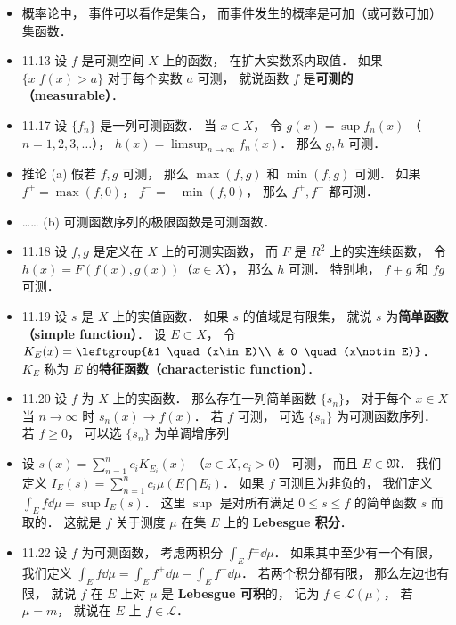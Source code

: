 \begin{itemize}
\item 概率论中， 事件可以看作是集合， 而事件发生的概率是可加（或可数可加）集函数．

\item 11.13 设 $f$ 是可测空间 $X$ 上的函数， 在扩大实数系内取值． 如果 $\{x|f(x)>a\}$ 对于每个实数 $a$ 可测， 就说函数 $f$ 是\textbf{可测的（measurable）}．

\item 11.17 设 $\{f_n\}$ 是一列可测函数． 当 $x\in X$， 令 $g(x)=\sup f_n(x)$ （$n=1,2,3,\dots$）， $h(x)=\limsup_{n\to\infty} f_n(x)$． 那么 $g,h$ 可测．

\item 推论 (a) 假若 $f,g$ 可测， 那么 $\max(f,g)$ 和 $\min(f,g)$ 可测． 如果 $f^+=\max(f,0)$， $f^-=-\min(f,0)$， 那么 $f^+,f^-$ 都可测．

\item …… (b) 可测函数序列的极限函数是可测函数．

\item 11.18 设 $f,g$ 是定义在 $X$ 上的可测实函数， 而 $F$ 是 $R^2$ 上的实连续函数， 令 $h(x)=F(f(x),g(x))$（$x\in X$）， 那么 $h$ 可测． 特别地， $f+g$ 和 $fg$ 可测．

\item 11.19 设 $s$ 是 $X$ 上的实值函数． 如果 $s$ 的值域是有限集， 就说 $s$ 为\textbf{简单函数（simple function）}． 设 $E\subset X$， 令 $K_E(x)=\leftgroup{&1 \quad  (x\in E)\\ & 0 \quad (x\notin E)}$． $K_E$ 称为 $E$ 的\textbf{特征函数（characteristic function）}．

\item 11.20 设 $f$ 为 $X$ 上的实函数． 那么存在一列简单函数 $\{s_n\}$， 对于每个 $x\in X$ 当 $n\to\infty$ 时 $s_n(x)\to f(x)$． 若 $f$ 可测， 可选 $\{s_n\}$ 为可测函数序列． 若 $f\geqslant 0$， 可以选 $\{s_n\}$ 为单调增序列

\item 设 $s(x) = \sum_{n=1}^n c_i K_{E_i}(x)$ （$x\in X, c_i>0$） 可测， 而且 $E\in \mathfrak M$． 我们定义 $I_E(s) = \sum_{n=1}^n c_i \mu(E\bigcap E_i)$． 如果 $f$ 可测且为非负的， 我们定义 $\int_E f\dd{\mu} = \sup I_E(s)$． 这里 $\sup$ 是对所有满足 $0\leqslant s\leqslant f$ 的简单函数 $s$ 而取的． 这就是 $f$ 关于测度 $\mu$ 在集 $E$ 上的 \textbf{Lebesgue 积分}．

\item 11.22 设 $f$ 为可测函数， 考虑两积分 $\int_E f^\pm \dd{\mu}$． 如果其中至少有一个有限， 我们定义 $\int_E f\dd{\mu} = \int_E f^+\dd{\mu} - \int_E f^-\dd{\mu}$． 若两个积分都有限， 那么左边也有限， 就说 $f$ 在 $E$ 上对 $\mu$ 是 \textbf{Lebesgue 可积}的， 记为 $f\in \mathscr L(\mu)$， 若 $\mu=m$， 就说在 $E$ 上 $f\in \mathscr L$．
\end{itemize}
